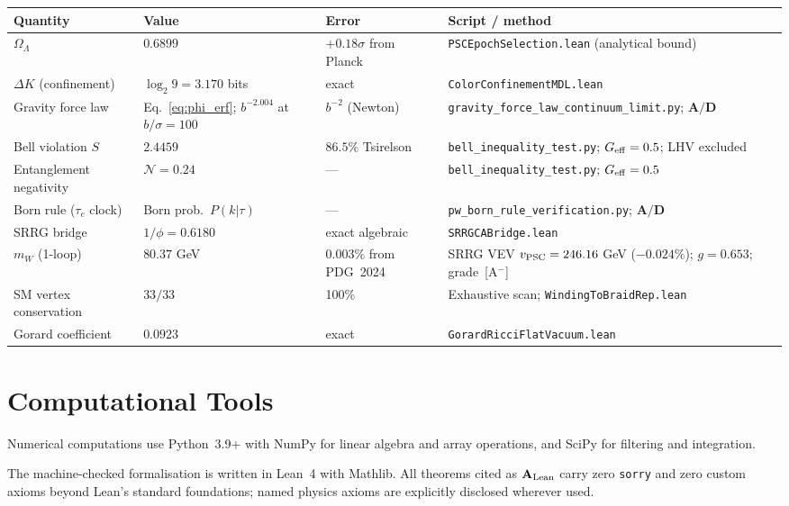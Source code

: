 \documentclass[11pt]{article}
\theoremstyle{remark}
\newcommand{\OmegaL}{\Omega_\Lambda}
\newcommand{\CatAL}{\ensuremath{\textbf{A}_{\rm Lean}}}
\newcommand{\CatAD}{\textbf{A/D}}
\begin{document}
\begin{appendices}
\begin{center}
\begin{tabular}{P{3.5cm}P{2cm}P{2cm}P{5cm}}
\toprule
\textbf{Quantity} & \textbf{Value} & \textbf{Error} & \textbf{Script / method}\\
\midrule
$\OmegaL$ & $0.6899$ & $+0.18\sigma$ from Planck
  & \texttt{PSCEpochSelection.lean} (analytical bound)\\[4pt]
$\Delta K$ (confinement) & $\log_2 9 = 3.170$ bits & exact
  & \texttt{ColorConfinementMDL.lean}\\[4pt]
Gravity force law
  & Eq.~\eqref{eq:phi_erf}; $b^{-2.004}$ at $b/\sigma=100$
  & $b^{-2}$ (Newton)
  & \texttt{gravity\_force\_\-law\_\-continuum\_\-limit.py}; $\CatAD$\\[4pt]
Bell violation $S$ & $2.4459$ & $86.5\%$ Tsirelson
  & \texttt{bell\_inequality\_\-test.py}; $G_{\rm eff}=0.5$; LHV excluded\\[4pt]
Entanglement negativity & $\mathcal{N}=0.24$ & ---
  & \texttt{bell\_inequality\_\-test.py}; $G_{\rm eff}=0.5$\\[4pt]
Born rule ($\tau_c$ clock) & Born prob.\ $P(k|\tau)$ & ---
  & \texttt{pw\_born\_rule\_\-verification.py}; $\CatAD$\\[4pt]
SRRG bridge & $1/\phi = 0.6180$ & exact algebraic
  & \texttt{SRRGCABridge.lean}\\[4pt]
$m_W$ (1-loop) & $80.37$ GeV & $0.003\%$ from PDG~2024
  & SRRG VEV $v_{\rm PSC}=246.16$ GeV ($-0.024\%$); $g=0.653$; grade~[A$^-$]\\[4pt]
SM vertex conservation & $33/33$ & 100\%
  & Exhaustive scan; \texttt{WindingToBraidRep.lean}\\[4pt]
Gorard coefficient & $0.0923$ & exact
  & \texttt{GorardRicci\-FlatVacuum.lean}\\
\bottomrule
\end{tabular}
\end{center}

\end{appendices}

\section*{Computational Tools}

Numerical computations use Python~3.9+ with NumPy for linear algebra and
array operations, and SciPy for filtering and integration.

The machine-checked formalisation is written in Lean~4 with Mathlib.
All theorems cited as $\CatAL$ carry zero \texttt{sorry} and zero custom
axioms beyond Lean's standard foundations; named physics axioms are
explicitly disclosed wherever used.
\end{document}
